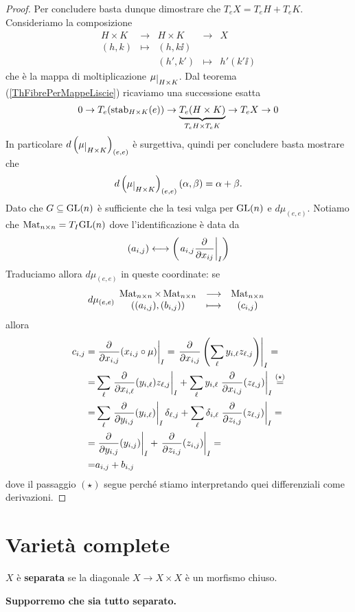 \begin{proof}
Per concludere basta dunque dimostrare che $T_e X=T_eH+T_eK$.
Consideriamo la composizione
\[\begin{array}{ccccc}
	H\times K &\xrightarrow{}& H\times K & \to &X \\
	(h,k) & \mapsto & (h,k\ii) &  & \\
	       &        & (h',k') &\mapsto & h'(k'{\ii}) 
\end{array}\] 
che \`e la mappa di moltiplicazione $\mu\res{H\times K}$. Dal teorema (\ref{ThFibrePerMappeLiscie}) ricaviamo una successione esatta
\[0\to T_e(\operatorname{stab}_{H\times K}(e))\to \underset{T_eH\times T_eK}{\underbrace{T_e(H\times K)}}\to T_eX\to 0\]
In particolare $d\pa{\mu\res{H\times K}}_{(e,e)}$ \`e surgettiva, quindi per concludere basta mostrare che 
\[d\pa{\mu\res{H\times K}}_{(e,e)}(\al,\beta)=\al+\beta.\]
Dato che $G\subseteq \mathrm{GL}(n)$ \`e sufficiente che la tesi valga per $\mathrm{GL}(n)$ e $d\mu_{(e,e)}$. Notiamo che $\operatorname{Mat}_{n\times n}=T_I\mathrm{GL}(n)$ dove l'identificazione \`e data da
\[(a_{i,j})\longleftrightarrow \pa{\rbar{a_{i,j}\pp{x_{ij}}{}}_{I}}\]
Traduciamo allora $d\mu_{(e,e)}$ in queste coordinate: se
\[d\mu_{(e,e)}\begin{array}{ccc} {\operatorname{Mat}_{n\times n}\times \operatorname{Mat}_{n\times n}} & \longrightarrow & {\operatorname{Mat}_{n\times n}}\\ {((a_{i,j}),(b_{i,j}))} & \longmapsto & {(c_{i,j})} \end{array}\]
allora
\begin{align*}
	c_{i,j}=&\rbar{\pp{x_{i,j}}{}(x_{i,j}\circ \mu)}_I=\rbar{\pp{x_{i,j}}{}\pa{\sum_\ell y_{i,\ell}z_{\ell,j}}}_I=\\
	=&\sum_\ell \rbar{\pp{x_{i,\ell}}{}(y_{i,\ell})z_{\ell,j}}_I + \sum_\ell y_{i,\ell}\rbar{\pp{x_{i,j}}{}(z_{\ell,j})}_I\overset{(\star)}=\\
	=&\sum_\ell \rbar{\pp{y_{i,j}}{}(y_{i,\ell})}_I\delta_{\ell,j} + \sum_\ell \delta_{i,\ell}\rbar{\pp{z_{i,j}}{}(z_{\ell,j})}_I=\\
	=&\rbar{\pp{y_{i,j}}{}(y_{i,j})}_I+\rbar{\pp{z_{i,j}}{}(z_{i,j})}_I=\\
	=&a_{i,j}+b_{i,j}
\end{align*}
dove il passaggio $(\star)$ segue perch\'e stiamo interpretando quei differenziali come derivazioni.
\end{proof}


\section{Variet\`a complete}

\begin{definition}
$X$ \`e \textbf{separata} se la diagonale $X\to X\times X$ \`e un morfismo chiuso.
\end{definition}
\begin{center}
	\textbf{Supporremo che sia tutto separato.}
\end{center}

